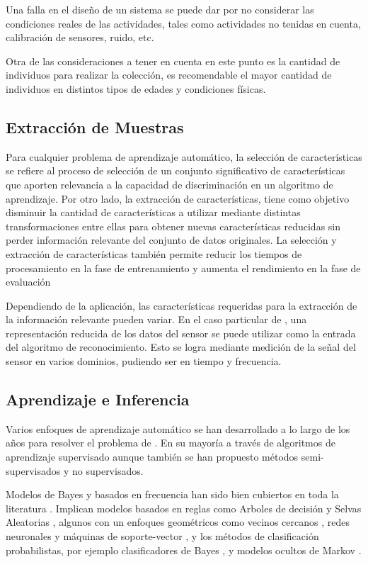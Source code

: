 Una falla en el diseño de un sistema  se puede dar por
no considerar las condiciones reales de las actividades, tales como
actividades no tenidas en cuenta, calibración de sensores, ruido,
etc.

Otra de las consideraciones a tener en cuenta en este punto es la
cantidad de individuos para realizar la colección, es recomendable
el mayor cantidad de individuos en distintos tipos de edades y condiciones
físicas.

\subsection{Extracción de Muestras}

Para cualquier problema de aprendizaje automático, la selección de
características se refiere al proceso de selección de un conjunto
significativo de características que aporten relevancia a la capacidad
de discriminación en un algoritmo de aprendizaje. Por otro lado, la
extracción de características, tiene como objetivo disminuir la cantidad
de características a utilizar mediante distintas transformaciones
entre ellas para obtener nuevas características reducidas sin perder
información relevante del conjunto de datos originales. La selección
y extracción de características también permite reducir los tiempos
de procesamiento en la fase de entrenamiento y aumenta el rendimiento
en la fase de evaluación

Dependiendo de la aplicación, las características requeridas para
la extracción de la información relevante pueden variar. En el caso
particular de , una representación reducida de los datos
del sensor se puede utilizar como la entrada del algoritmo de reconocimiento.
Esto se logra mediante medición de la señal del sensor en varios dominios,
pudiendo ser en tiempo y frecuencia.

\subsection{Aprendizaje e Inferencia}

Varios enfoques de aprendizaje automático se han desarrollado a lo
largo de los años para resolver el problema de . En su
mayoría a través de algoritmos de aprendizaje supervisado aunque también
se han propuesto métodos semi-supervisados y no supervisados.

Modelos de Bayes y basados en frecuencia han sido bien cubiertos en
toda la literatura . Implican modelos basados en reglas
como Arboles de decisión  y Selvas Aleatorias ,
algunos con un enfoques geométricos como vecinos cercanos ,
redes neuronales  y máquinas de soporte-vector ,
y los métodos de clasificación probabilistas, por ejemplo clasificadores
de Bayes , y modelos ocultos de Markov .

